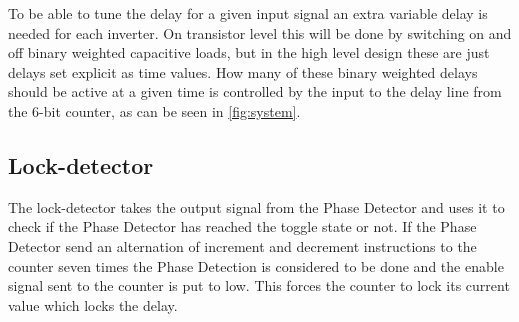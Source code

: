 \documentclass[a4paper,12pt]{article} \usepackage{graphicx}
\begin{document}
To be able to tune the delay for a given input signal an extra
variable delay is needed for each inverter. On transistor level this
will be done by switching on and off binary weighted capacitive loads,
but in the high level design these are just delays set explicit as time
values. How many of these binary weighted delays should be active at a
given time is controlled by the input to the delay line from the 6-bit
counter, as can be seen in \ref{fig:system}. 


\subsection{Lock-detector}
The lock-detector takes the output signal from the Phase Detector and uses
it to check if the Phase Detector has reached the toggle state or not. If the Phase
Detector send an alternation of increment and decrement instructions to the counter
seven times the Phase Detection is considered to be done and the enable 
signal sent to the counter is put to low. This forces the counter to lock its 
current value which locks the delay.
\end{document}
